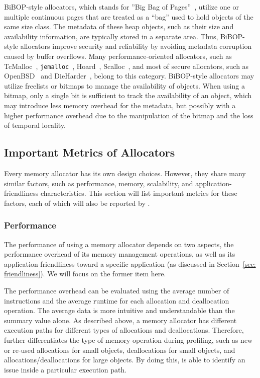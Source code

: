 BiBOP-style allocators, which stands for ''Big Bag of Pages''~\citep{hanson1980}, utilize one or multiple continuous pages that are treated as a ``bag'' used to hold objects of the same size class. The metadata of these heap objects, such as their size and availability information, are typically stored in a separate area. Thus, BiBOP-style allocators improve security and reliability by avoiding metadata corruption caused by buffer overflows. Many performance-oriented allocators, such as TcMalloc~\citep{tcmalloc}, \texttt{jemalloc}~\citep{jemalloc}, Hoard~\citep{Hoard}, Scalloc~\citep{Scalloc}, and most of secure allocators, such as OpenBSD~\citep{OpenBSD} and DieHarder~\citep{DieHarder}, belong to this category. BiBOP-style allocators may utilize freelists or bitmaps to manage the availability of objects. When using a bitmap, only a single bit is sufficient to track the availability of an object, which may introduce less memory overhead for the metadata, but possibly with a higher performance overhead due to the manipulation of the bitmap and the loss of temporal locality.  


\subsection{Important Metrics of Allocators}

\label{sec:factors}

Every memory allocator has its own design choices. However, they share many similar factors, such as performance, memory, scalability, and application-friendliness characteristics. This section will list important metrics for these factors, each of which will also be reported by \MP{}. 

\subsubsection{Performance}
\label{sec:performance}

The performance of using a memory allocator depends on two aspects, the performance overhead of its memory management operations, as well as its application-friendliness toward a specific application (as discussed in Section~\ref{sec: friendliness}). We will focus on the former item here. 

The performance overhead can be evaluated using the average number of instructions and the average runtime for each allocation and deallocation operation. The average data is more intuitive and understandable than the summary value alone. As described above, a memory allocator has different execution paths for different types of allocations and deallocations. Therefore, \MP{} further differentiates the type of memory operation during profiling, such as new or re-used allocations for small objects, deallocations for small objects, and allocations/deallocations for large objects. By doing this, \MP{} is able to identify an issue inside a particular execution path.

